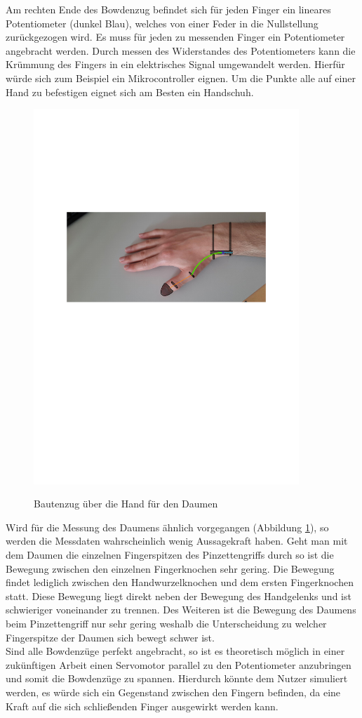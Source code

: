 \documentclass[a4paper,12pt,final]{article} %
\numberwithin{equation}{section} %
\numberwithin{figure}{section} %
\numberwithin{table}{section} %
\begin{document}
Am rechten Ende des Bowdenzug befindet sich für jeden Finger ein lineares Potentiometer (dunkel Blau), welches von einer Feder in die Nullstellung zurückgezogen wird.
Es muss für jeden zu messenden Finger ein Potentiometer angebracht werden. Durch messen des Widerstandes des Potentiometers kann die Krümmung des Fingers in ein elektrisches Signal umgewandelt werden. Hierfür würde sich zum Beispiel ein Mikrocontroller eignen. 
Um die Punkte alle auf einer Hand zu befestigen eignet sich am Besten ein Handschuh. 
\begin{figure}[H]
	\begin{center}
		\includegraphics[width=10cm]{Bilder/HandPhoto2.pdf}
		\label{fig:HandDaumen}
		\caption{Bautenzug über die Hand für den Daumen}
	\end{center}
\end{figure}
Wird für die Messung des Daumens ähnlich vorgegangen (Abbildung \ref{fig:HandDaumen}), so werden die Messdaten wahrscheinlich wenig Aussagekraft haben.
Geht man mit dem Daumen die einzelnen Fingerspitzen des Pinzettengriffs durch so ist die Bewegung zwischen den einzelnen Fingerknochen sehr gering. Die Bewegung findet lediglich zwischen den Hand\-wur\-zel\-knoch\-en und dem ersten Fingerknochen statt.
Diese Bewegung liegt direkt neben der Bewegung des Handgelenks und ist schwieriger voneinander zu trennen. Des Weiteren ist die Bewegung des Daumens beim Pinzettengriff nur sehr gering weshalb  die Unterscheidung zu welcher Fingerspitze der Daumen sich bewegt schwer ist.\\
Sind alle Bowdenzüge perfekt angebracht, so ist es theoretisch möglich in einer zukünftigen Arbeit einen Servomotor parallel zu den Potentiometer anzubringen und somit die Bowdenzüge zu spannen.
Hierdurch könnte dem Nutzer simuliert werden, es würde sich ein Gegenstand zwischen den Fingern befinden, da eine Kraft auf die sich schließenden Finger ausgewirkt werden kann.  
\end{document}
